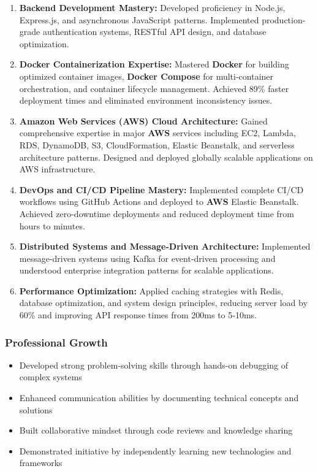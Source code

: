 \begin{enumerate}
    \item \textbf{Backend Development Mastery:} Developed proficiency in Node.js, Express.js, and asynchronous JavaScript patterns. Implemented production-grade authentication systems, RESTful API design, and database optimization.
    
    \item \textbf{Docker Containerization Expertise:} Mastered \textbf{Docker} for building optimized container images, \textbf{Docker Compose} for multi-container orchestration, and container lifecycle management. Achieved 89\% faster deployment times and eliminated environment inconsistency issues.
    
    \item \textbf{Amazon Web Services (AWS) Cloud Architecture:} Gained comprehensive expertise in major \textbf{AWS} services including EC2, Lambda, RDS, DynamoDB, S3, CloudFormation, Elastic Beanstalk, and serverless architecture patterns. Designed and deployed globally scalable applications on AWS infrastructure.
    
    \item \textbf{DevOps and CI/CD Pipeline Mastery:} Implemented complete CI/CD workflows using GitHub Actions and deployed to \textbf{AWS} Elastic Beanstalk. Achieved zero-downtime deployments and reduced deployment time from hours to minutes.
    
    \item \textbf{Distributed Systems and Message-Driven Architecture:} Implemented message-driven systems using Kafka for event-driven processing and understood enterprise integration patterns for scalable applications.
    
    \item \textbf{Performance Optimization:} Applied caching strategies with Redis, database optimization, and system design principles, reducing server load by 60\% and improving API response times from 200ms to 5-10ms.
\end{enumerate}

\subsubsection{Professional Growth}

\begin{itemize}
    \item Developed strong problem-solving skills through hands-on debugging of complex systems
    \item Enhanced communication abilities by documenting technical concepts and solutions
    \item Built collaborative mindset through code reviews and knowledge sharing
    \item Demonstrated initiative by independently learning new technologies and frameworks
\end{itemize}

